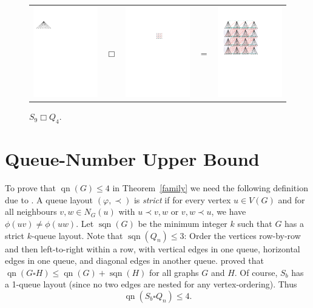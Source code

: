 \documentclass[kpfonts]{patmorin}
\DeclareMathOperator{\qn}{qn}
\DeclareMathOperator{\sqn}{sqn}
\renewcommand{\leq}{\leqslant}
\begin{document}
\begin{figure}
	\begin{center}
		\begin{tabular}{m{}m{2ex}m{}m{2ex}m{}}
		\includegraphics[width=.25\textwidth]{figs/s} & $\Box$ & \includegraphics[width=.25\textwidth]{figs/q} & $=$
		& \includegraphics[width=.3\textwidth]{figs/product}
	\end{tabular}
	\end{center}
	\caption{$S_9\Box Q_4$.}
\end{figure}

\section{Queue-Number Upper Bound}

To prove that $\qn(G)\leq 4$ in Theorem~\ref{family} we need the following definition due to \citet{Wood-Queue-DMTCS05}. A queue layout $(\varphi,\prec)$ is \emph{strict} if for every vertex $u\in V(G)$ and for all neighbours $v,w\in N_G(u)$ with $u\prec v,w$ or $v,w \prec u$, we have $\phi(uv)\neq \phi(uw)$. Let $\sqn(G)$ be the minimum integer $k$ such that $G$ has a strict $k$-queue layout.
Note that $\sqn(Q_n) \leq 3$: Order the vertices row-by-row and then left-to-right within a row, with vertical edges in one queue, horizontal edges in one queue, and diagonal edges in another queue.
\citet{Wood-Queue-DMTCS05} proved that $\qn(G \square H) \leq \qn(G) + \sqn(H)$ for all graphs $G$ and $H$. Of course, $S_b$ has a 1-queue layout (since no two edges are nested for any vertex-ordering). Thus
$$\qn(S_b \square Q_n)\leq 4.$$
\end{document}
